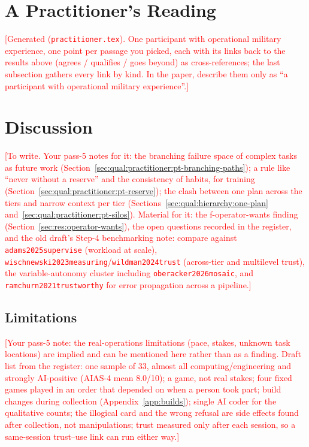 \documentclass[10pt]{article}
\theoremstyle{definition}
\newcommand{\todo}[1]{\textcolor{red}{[#1]}}
\begin{document}


\section{A Practitioner's Reading}\label{sec:practitioner}

\todo{Generated (\texttt{practitioner.tex}). One participant with operational military experience, one point per
passage you picked, each with its links back to the results above (agrees / qualifies / goes beyond) as
cross-references; the last subsection gathers every link by kind. In the paper, describe them only as ``a participant
with operational military experience''.}



\section{Discussion}\label{sec:discussion}

\todo{To write. Your pass-5 notes for it: the branching failure space of complex tasks as future work
(Section~\ref{sec:qual:practitioner:pt-branching-paths}); a rule like ``never without a reserve'' and the consistency
of habits, for training (Section~\ref{sec:qual:practitioner:pt-reserve}); the clash between one plan across the tiers
and narrow context per tier (Sections~\ref{sec:qual:hierarchy:one-plan} and~\ref{sec:qual:practitioner:pt-silos}).
Material for it: the f-operator-wants finding (Section~\ref{sec:res:operator-wants}), the
open questions recorded in the register, and the old draft's Step-4 benchmarking note: compare against
\texttt{adams2025supervise} (workload at scale), \texttt{wischnewski2023measuring}/\texttt{wildman2024trust}
(across-tier and multilevel trust), the variable-autonomy cluster including \texttt{oberacker2026mosaic}, and
\texttt{ramchurn2021trustworthy} for error propagation across a pipeline.}

\subsection{Limitations}
\todo{Your pass-5 note: the real-operations limitations (pace, stakes, unknown task locations) are implied and can be
mentioned here rather than as a finding. Draft list from the register: one sample of 33, almost all computing/engineering and strongly AI-positive
(AIAS-4 mean 8.0/10); a game, not real stakes; four fixed games played in an order that depended on when a person took
part; build changes during collection (Appendix~\ref{app:builds}); single AI coder for the qualitative counts; the
illogical card and the wrong refusal are side effects found after collection, not manipulations; trust measured only
after each session, so a same-session trust--use link can run either way.}
\end{document}
